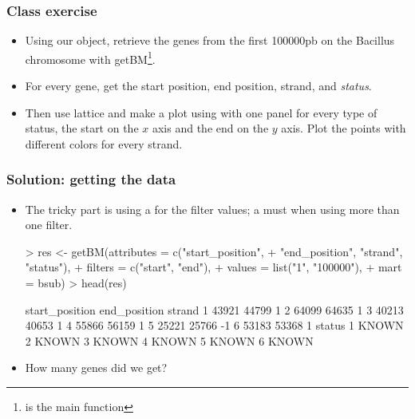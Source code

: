 \begin{frame}[allowframebreaks]
  \frametitle{Class exercise}
  \begin{itemize}
  \item Using our   object, retrieve the genes from the first 100000pb on the Bacillus chromosome with \alert{getBM}\footnote{ is the main  function}.
  \item For every gene, get the start position, end position, strand, and \emph{status}.
  \item Then use \alert{lattice} and make a plot using  with one panel for every type of status, the start on the $x$ axis and the end on the $y$ axis. Plot the points with different colors for every strand.
  \end{itemize}
\end{frame}

\begin{frame}
  \frametitle{Solution: getting the data}
  \begin{itemize}
  \item The tricky part is using a  for the filter values; a must when using more than one filter.
\begin{Schunk}
\begin{Sinput}
> res <- getBM(attributes = c("start_position", 
+     "end_position", "strand", "status"), 
+     filters = c("start", "end"), 
+     values = list("1", "100000"), 
+     mart = bsub)
> head(res)
\end{Sinput}
\begin{Soutput}
  start_position end_position strand
1          43921        44799      1
2          64099        64635      1
3          40213        40653      1
4          55866        56159      1
5          25221        25766     -1
6          53183        53368      1
  status
1  KNOWN
2  KNOWN
3  KNOWN
4  KNOWN
5  KNOWN
6  KNOWN
\end{Soutput}
\end{Schunk}
  \item How many genes did we get?
  \end{itemize}
\end{frame}

